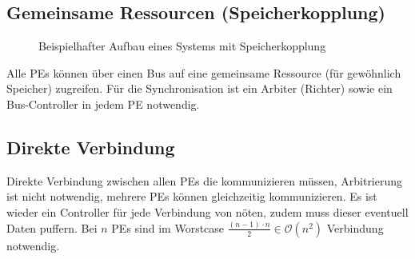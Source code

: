 \subsection{Gemeinsame Ressourcen (Speicherkopplung)}
\begin{figure}[H]
    \centering
    \caption{Beispielhafter Aufbau eines Systems mit Speicherkopplung}
\end{figure}
Alle PEs können über einen Bus auf eine gemeinsame Ressource (für gewöhnlich Speicher) zugreifen. 
Für die Synchronisation ist ein \glqq{}Arbiter\grqq{} (Richter) sowie ein Bus-Controller in jedem PE notwendig.

\subsection{Direkte Verbindung}
Direkte Verbindung zwischen allen PEs die kommunizieren müssen, Arbitrierung ist nicht notwendig, mehrere PEs können gleichzeitig kommunizieren. 
Es ist wieder ein Controller für jede Verbindung von nöten, zudem muss dieser eventuell Daten puffern. 
Bei $n$ PEs sind im Worstcase $\frac{(n-1)\cdot n}{2} \in  \mathcal{O}(n^2)$ Verbindung notwendig.

